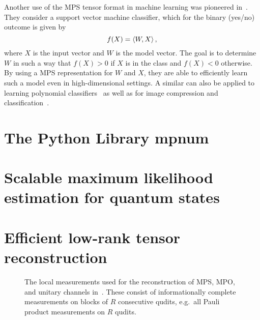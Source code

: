 Another use of the MPS tensor format in machine learning was pioneered in~\cite{Stoudenmire_2016_Supervised}.
They consider a support vector machine classifier, which for the binary (yes/no) outcome is given by
\[
  f(X) = \braket{W, X},
\]
where $X$ is the input vector and $W$ is the model vector.
The goal is to determine $W$ in such a way that $f(X) > 0$ if $X$ is in the  class and $f(X) < 0$ otherwise.
By using a MPS representation for $W$ and $X$, they are able to efficiently learn such a model even in high-dimensional settings.
A similar can also be applied to learning polynomial classifiers~\cite{Chen_2017_Parallelized} as well as for image compression and classification~\cite{Bengua}.



\section{The Python Library mpnum}%
\label{sec:tensors.mpnum}




\section{Scalable maximum likelihood estimation for quantum states}%
\label{sec:tensors.mle}

%

\section{Efficient low-rank tensor reconstruction}%
\label{sec:tensors.als}

\begin{figure*}
  \centering
  
  \caption{%
    The local measurements used for the reconstruction of MPS, MPO, and unitary channels in~\cite{Cramer_2010_Efficient,Baumgratz_2013_Scalable,Baumgratz_2013_Scalablea,Lanyon_2017_Efficient,Holzaepfel_2014_Scalable}.
    These consist of informationally complete measurements on blocks of $R$ consecutive qudits, e.g.\ all Pauli product measurements on $R$ qudits.
    }%
  \label{fig:als.quantum_measurements}
\end{figure*}

